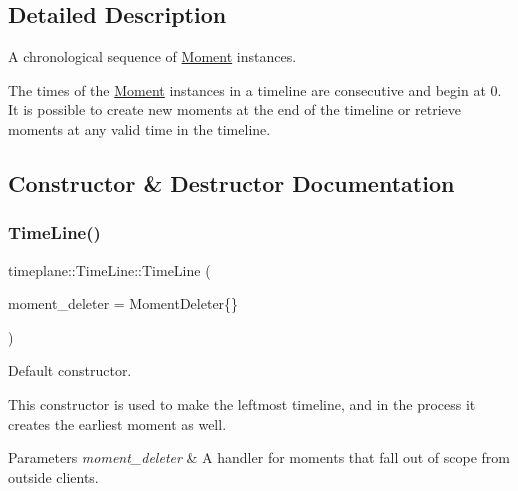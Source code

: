\subsection{Detailed Description}
A chronological sequence of {\ttfamily \hyperlink{classtimeplane_1_1_moment}{Moment}} instances. 

The times of the {\ttfamily \hyperlink{classtimeplane_1_1_moment}{Moment}} instances in a timeline are consecutive and begin at 0. It is possible to create new moments at the end of the timeline or retrieve moments at any valid time in the timeline. 

\subsection{Constructor \& Destructor Documentation}
\mbox{\label{classtimeplane_1_1_time_line_afacd08f817ddae17b1dea9c1989f74ae}} 
\subsubsection{\texorpdfstring{Time\+Line()}{TimeLine()}\hspace{0.1cm}{\footnotesize\ttfamily [1/2]}}
{\footnotesize\ttfamily timeplane\+::\+Time\+Line\+::\+Time\+Line (\begin{DoxyParamCaption}\item[{Moment\+Deleter}]{moment\+\_\+deleter = {\ttfamily MomentDeleter\{\}} }\end{DoxyParamCaption})}



Default constructor. 

This constructor is used to make the leftmost timeline, and in the process it creates the earliest moment as well. 
\begin{DoxyParams}{Parameters}
{\em moment\+\_\+deleter} & A handler for moments that fall out of scope from outside clients. \\
\hline
\end{DoxyParams}
\mbox{\label{classtimeplane_1_1_time_line_a5e9a864bc9838c82dc3e5a50e69ece9b}} 

